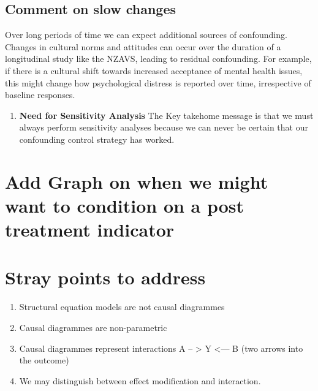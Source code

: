 \documentclass[
  singlecolumn]{report}
\providecommand{\tightlist}{%
  \setlength{\itemsep}{0pt}\setlength{\parskip}{0pt}}\usepackage{longtable,booktabs,array}
\begin{document}
\hypertarget{comment-on-slow-changes}{%
\subsection{Comment on slow changes}\label{comment-on-slow-changes}}

Over long periods of time we can expect additional sources of
confounding. Changes in cultural norms and attitudes can occur over the
duration of a longitudinal study like the NZAVS, leading to residual
confounding. For example, if there is a cultural shift towards increased
acceptance of mental health issues, this might change how psychological
distress is reported over time, irrespective of baseline responses.

\begin{enumerate}
\def\labelenumi{\arabic{enumi}.}
\setcounter{enumi}{9}
\tightlist
\item
  \textbf{Need for Sensitivity Analysis} The Key takehome message is
  that we must always perform sensitivity analyses because we can never
  be certain that our confounding control strategy has worked.
\end{enumerate}

\hypertarget{add-graph-on-when-we-might-want-to-condition-on-a-post-treatment-indicator}{%
\section{Add Graph on when we might want to condition on a post
treatment
indicator}\label{add-graph-on-when-we-might-want-to-condition-on-a-post-treatment-indicator}}

\hypertarget{stray-points-to-address}{%
\section{Stray points to address}\label{stray-points-to-address}}

\begin{enumerate}
\def\labelenumi{\arabic{enumi}.}
\tightlist
\item
  Structural equation models are not causal diagrammes
\item
  Causal diagrammes are non-parametric
\item
  Causal diagrammes represent interactions A -- \textgreater{} Y
  \textless--- B (two arrows into the outcome)
\item
  We may distinguish between effect modification and interaction.
\end{enumerate}
\end{document}
